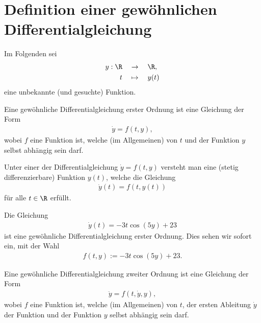 \section{Definition einer gewöhnlichen Differentialgleichung}
Im Folgenden sei
\begin{align*}
  y: \R\quad &\to \quad\R,\\
  t \quad &\mapsto \quad y(t)
\end{align*}
eine unbekannte (und gesuchte) Funktion.

\begin{mydefinition}\label{mydefinition:ode1}
  Eine gewöhnliche Differentialgleichung erster Ordnung ist eine Gleichung der Form
  \begin{align*}
    \dot{y} = f(t, y),
  \end{align*}
  wobei $f$ eine Funktion ist, welche (im Allgemeinen) von $t$ und der Funktion $y$ selbst abhängig sein darf.

  \par
  Unter einer  der Differentialgleichung $\dot{y} = f(t, y)$ versteht man eine (stetig differenzierbare) Funktion $y(t)$, welche die Gleichung
  \begin{align*}
    \dot{y}(t) = f(t, y(t))
  \end{align*}
  für alle $t\in\R$ erfüllt.
\end{mydefinition}

\begin{myexample}
  Die Gleichung
  \begin{align*}
    \dot{y}(t) = -3t\cos(5y) + 23
  \end{align*}
  ist eine gewöhnliche Differentialgleichung erster Ordnung. Dies sehen wir sofort ein, mit der Wahl
  \begin{align*}
    f(t, y) := -3t\cos(5y) + 23.
  \end{align*}
\end{myexample}

\begin{mydefinition}\label{mydefinition:ode2}
  Eine gewöhnliche Differentialgleichung zweiter Ordnung ist eine Gleichung der Form
  \begin{align*}
    \ddot{y} = f(t, \dot{y}, y),
  \end{align*}
  wobei $f$ eine Funktion ist, welche (im Allgemeinen) von $t$, der ersten Ableitung $\dot{y}$ der Funktion und der Funktion $y$ selbst abhängig sein darf.
\end{mydefinition}

